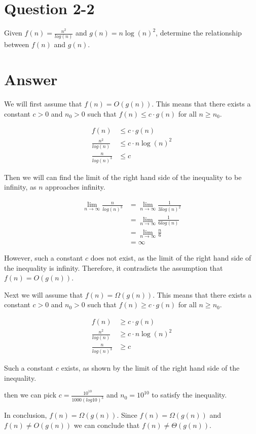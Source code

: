 \documentclass{article}
\begin{document}
\section{Question 2-2}
Given $f(n) = \frac{n^2}{log(n)}$ and $g(n) = n\log(n)^2$, determine the relationship between $f(n)$ and $g(n)$.

\section{Answer}
We will first assume that $f(n) = O(g(n))$. This means that there exists a constant $c > 0$ and $n_0 > 0$ such that $f(n) \leq c \cdot g(n)$ for all $n \geq n_0$.

\begin{align*}
f(n) &\leq c \cdot g(n) \\
\frac{n^2}{log(n)} &\leq c \cdot n\log(n)^2 \\
\frac{n}{log(n)^3} &\leq c
\end{align*}

Then we will can find the limit of the right hand side of the inequality to be infinity, as $n$ approaches infinity.

\begin{align*}
\lim_{n \to \infty} \frac{n}{log(n)^3} &= \lim_{n \to \infty} \frac{1}{3log(n)^2} \tag{L'Hopital}\\
&= \lim_{n \to \infty} \frac{1}{6log(n)} \\
&= \lim_{n \to \infty} \frac{n}{6} \\
&= \infty
\end{align*}

However, such a constant $c$ does not exist, as the limit of the right hand side of the inequality is infinity. Therefore, it contradicts the assumption that $f(n) = O(g(n))$.

Next we will assume that $f(n) = \Omega(g(n))$. This means that there exists a constant $c > 0$ and $n_0 > 0$ such that $f(n) \geq c \cdot g(n)$ for all $n \geq n_0$.

\begin{align*}
f(n) &\geq c \cdot g(n) \\
\frac{n^2}{log(n)} &\geq c \cdot n\log(n)^2 \\
\frac{n}{log(n)^3} &\geq c
\end{align*}

Such a constant $c$ exists, as shown by the limit of the right hand side of the inequality.

then we can pick $c = \frac{10^{10}}{1000(log10)^3}$ and $n_0 = 10^{10}$ to satisfy the inequality.

In conclusion, $f(n) = \Omega(g(n))$. Since $f(n) = \Omega(g(n))$ and $f(n) \ne O(g(n))$ we can conclude that $f(n) \ne \Theta(g(n))$.
\end{document}
